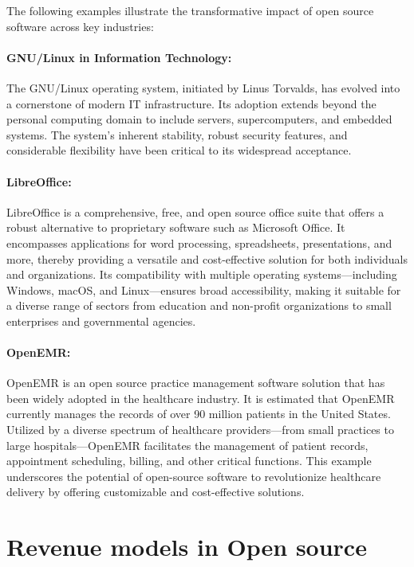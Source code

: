 The following examples illustrate the transformative impact of open source software across key industries:

\paragraph{GNU/Linux in Information Technology:}  
The GNU/Linux operating system, initiated by Linus Torvalds, has evolved into a cornerstone of modern IT infrastructure. Its adoption extends beyond the personal computing domain to include servers, supercomputers, and embedded systems. The system’s inherent stability, robust security features, and considerable flexibility have been critical to its widespread acceptance.
\cite{Open-source-Success-Stories}

\paragraph{LibreOffice:}  
LibreOffice is a comprehensive, free, and open source office suite that offers a robust alternative to proprietary software such as Microsoft Office. It encompasses applications for word processing, spreadsheets, presentations, and more, thereby providing a versatile and cost-effective solution for both individuals and organizations. Its compatibility with multiple operating systems—including Windows, macOS, and Linux—ensures broad accessibility, making it suitable for a diverse range of sectors from education and non-profit organizations to small enterprises and governmental agencies.
\cite{LibreOffice-Website}

\paragraph{OpenEMR:}  
OpenEMR is an open source practice management software solution that has been widely adopted in the healthcare industry. It is estimated that OpenEMR currently manages the records of over 90 million patients in the United States. Utilized by a diverse spectrum of healthcare providers—from small practices to large hospitals—OpenEMR facilitates the management of patient records, appointment scheduling, billing, and other critical functions. This example underscores the potential of open-source software to revolutionize healthcare delivery by offering customizable and cost-effective solutions.

\cite{op-emr-rev}

\section{Revenue models in Open source}

